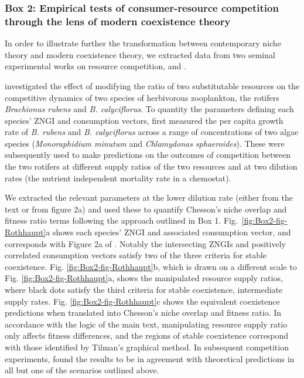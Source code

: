 \clearpage
\begin{tcolorbox}[breakable, leftright skip=-0.5cm]
\subsubsection*{Box 2: Empirical tests of consumer-resource competition through the lens of modern coexistence theory}
In order to illustrate further the transformation between contemporary niche theory and modern coexistence theory, we extracted data from two seminal experimental works on resource competition, \citet{Rothhaupt1988} and \citet{Tilman1977}. 
\par


\citet{Rothhaupt1988} investigated the effect of modifying the ratio of two substitutable resources on the competitive dynamics of two species of herbivorous zooplankton, the rotifers \textit{Brachionus rubens} and \textit{B. calyciflorus}. To quantity the parameters defining each species' ZNGI and consumption vectors, \citet{Rothhaupt1988} first measured the per capita growth rate of \textit{B. rubens} and \textit{B. calyciflorus} across a range of concentrations of two algae species (\textit{Monoraphidium minutum} and \textit{Chlamydonas sphaeroides}). These were subsequently used to make predictions on the outcomes of competition between the two rotifers at different supply ratios of the two resources and at two dilution rates (the nutrient independent mortality rate in a chemostat).
\par


We extracted the relevant parameters at the lower dilution rate (either from the text or from figure 2a) and used these to quantify Chesson's niche overlap and fitness ratio terms following the approach outlined in Box 1. Fig.~\ref{fig:Box2-fig-Rothhaupt}a shows each species' ZNGI and associated consumption vector, and corresponds with Figure 2a of \citet{Rothhaupt1988}. Notably the intersecting ZNGIs and positively correlated consumption vectors satisfy two of the three criteria for stable coexistence. Fig. \ref{fig:Box2-fig-Rothhaupt}b, which is drawn on a different scale to Fig. \ref{fig:Box2-fig-Rothhaupt}a, shows the manipulated resource supply ratios, where black dots satisfy the third criteria for stable coexistence, intermediate supply rates. Fig. \ref{fig:Box2-fig-Rothhaupt}c shows the equivalent coexistence predictions when translated into Chesson's niche overlap and fitness ratio. In accordance with the logic of the main text, manipulating resource supply ratio only affects fitness differences, and the regions of stable coexistence correspond with those identified by Tilman's graphical method. In subsequent competition experiments, \citet{Rothhaupt1988} found the results to be in agreement with theoretical predictions in all but one of the scenarios outlined above.
\par



\end{tcolorbox}
